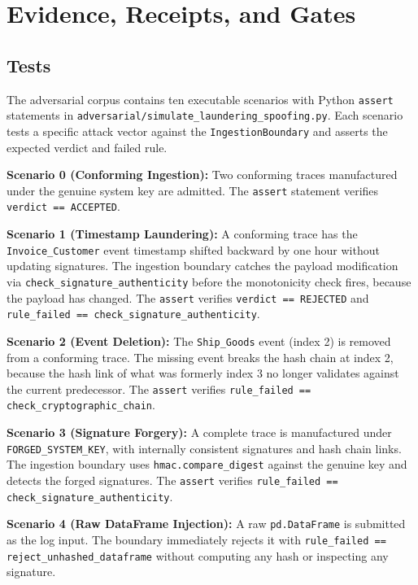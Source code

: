 
\section{Evidence, Receipts, and Gates}
\label{sec:adversarial-evidence}

\subsection{Tests}
\label{sec:adversarial-evidence-tests}

The adversarial corpus contains ten executable scenarios with Python \texttt{assert}
statements in \texttt{adversarial/simulate\_laundering\_spoofing.py}. Each scenario tests a
specific attack vector against the \texttt{IngestionBoundary} and asserts the expected
verdict and failed rule.

\textbf{Scenario 0 (Conforming Ingestion):} Two conforming traces manufactured under the
genuine system key are admitted. The \texttt{assert} statement verifies \texttt{verdict ==
ACCEPTED}.

\textbf{Scenario 1 (Timestamp Laundering):} A conforming trace has the
\texttt{Invoice\_Customer} event timestamp shifted backward by one hour without updating
signatures. The ingestion boundary catches the payload modification via
\texttt{check\_signature\_authenticity} before the monotonicity check fires, because the
payload has changed. The \texttt{assert} verifies \texttt{verdict == REJECTED} and
\texttt{rule\_failed == check\_signature\_authenticity}.

\textbf{Scenario 2 (Event Deletion):} The \texttt{Ship\_Goods} event (index 2) is removed
from a conforming trace. The missing event breaks the hash chain at index 2, because the
hash link of what was formerly index 3 no longer validates against the current predecessor.
The \texttt{assert} verifies \texttt{rule\_failed == check\_cryptographic\_chain}.

\textbf{Scenario 3 (Signature Forgery):} A complete trace is manufactured under
\texttt{FORGED\_SYSTEM\_KEY}, with internally consistent signatures and hash chain links.
The ingestion boundary uses \texttt{hmac.compare\_digest} against the genuine key and
detects the forged signatures. The \texttt{assert} verifies
\texttt{rule\_failed == check\_signature\_authenticity}.

\textbf{Scenario 4 (Raw DataFrame Injection):} A raw \texttt{pd.DataFrame} is submitted as
the log input. The boundary immediately rejects it with \texttt{rule\_failed ==
reject\_unhashed\_dataframe} without computing any hash or inspecting any signature.

